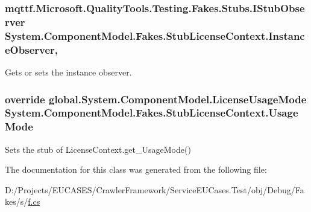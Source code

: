\hypertarget{class_system_1_1_component_model_1_1_fakes_1_1_stub_license_context_a5cfba997a7538681dad9be6b782974f1}{
\subsubsection[{Instance\-Observer}]{\setlength{\rightskip}{0pt plus 5cm}mqttf.\-Microsoft.\-Quality\-Tools.\-Testing.\-Fakes.\-Stubs.\-I\-Stub\-Observer System.\-Component\-Model.\-Fakes.\-Stub\-License\-Context.\-Instance\-Observer\hspace{0.3cm}{\ttfamily [get]}, {\ttfamily [set]}}}\label{class_system_1_1_component_model_1_1_fakes_1_1_stub_license_context_a5cfba997a7538681dad9be6b782974f1}


Gets or sets the instance observer.

\hypertarget{class_system_1_1_component_model_1_1_fakes_1_1_stub_license_context_ad0de5ddeb6d5902f8fa1ba2d99868ab4}{
\subsubsection[{Usage\-Mode}]{\setlength{\rightskip}{0pt plus 5cm}override global.\-System.\-Component\-Model.\-License\-Usage\-Mode System.\-Component\-Model.\-Fakes.\-Stub\-License\-Context.\-Usage\-Mode\hspace{0.3cm}{\ttfamily [get]}}}\label{class_system_1_1_component_model_1_1_fakes_1_1_stub_license_context_ad0de5ddeb6d5902f8fa1ba2d99868ab4}


Sets the stub of License\-Context.\-get\-\_\-\-Usage\-Mode()



The documentation for this class was generated from the following file\-:\begin{DoxyCompactItemize}
\item 
D\-:/\-Projects/\-E\-U\-C\-A\-S\-E\-S/\-Crawler\-Framework/\-Service\-E\-U\-Cases.\-Test/obj/\-Debug/\-Fakes/s/\hyperlink{s_2f_8cs}{f.\-cs}\end{DoxyCompactItemize}
